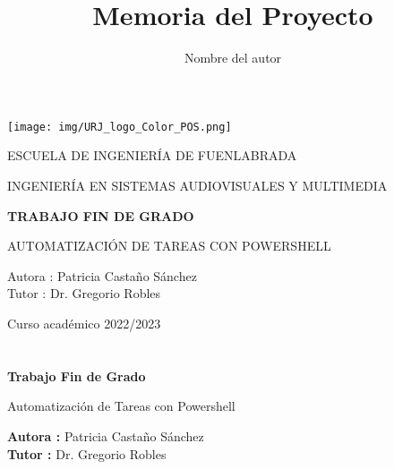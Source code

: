 \documentclass[a4paper, 12pt]{book}
\title{Memoria del Proyecto}
\author{Nombre del autor}
\begin{document}

\begin{titlepage}
\begin{center}
\texttt{[image: img/URJ\_logo\_Color\_POS.png]}

\vspace{1.75cm}

\LARGE
ESCUELA DE INGENIERÍA DE FUENLABRADA
\vspace{1cm}

\LARGE
INGENIERÍA EN SISTEMAS AUDIOVISUALES Y MULTIMEDIA

\vspace{1cm}
\LARGE
\textbf{TRABAJO FIN DE GRADO}

\vspace{2cm}

\Large
AUTOMATIZACIÓN DE TAREAS CON POWERSHELL

\vspace{2cm}

\large
Autora : Patricia Castaño Sánchez \\
Tutor : Dr. Gregorio Robles \\
\vspace{1cm}

\large
Curso académico 2022/2023

\end{center}
\end{titlepage}

\newpage
\mbox{}
\thispagestyle{empty} %



\clearpage
{}
\chapter*{}

\vspace{-4cm}
\begin{center}
\LARGE
\textbf{Trabajo Fin de Grado}

\vspace{1cm}
\large
Automatización de Tareas con Powershell

\vspace{1cm}
\large
\textbf{Autora :} Patricia Castaño Sánchez \\
\textbf{Tutor :} Dr. Gregorio Robles

\end{center}
\end{document}
